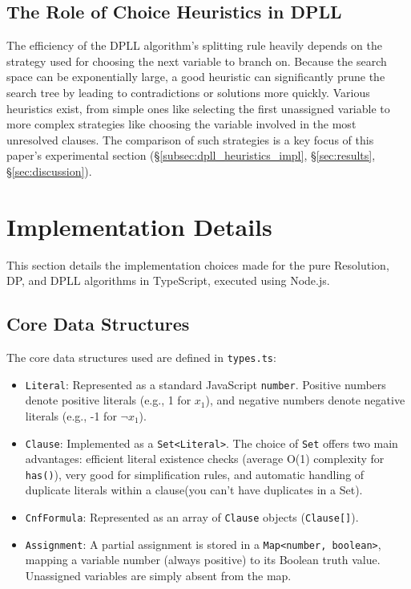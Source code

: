 \documentclass[12pt, a4paper]{article}
\begin{document}
\subsection{The Role of Choice Heuristics in DPLL}
\label{subsec:heuristics_intro}

The efficiency of the DPLL algorithm's splitting rule heavily depends on the strategy used for choosing the next variable to branch on. Because the search space can be exponentially large, a good heuristic can significantly prune the search tree by leading to contradictions or solutions more quickly. Various heuristics exist, from simple ones like selecting the first unassigned variable to more complex strategies like choosing the variable involved in the most unresolved clauses. The comparison of such strategies is a key focus of this paper's experimental section (\S\ref{subsec:dpll_heuristics_impl}, \S\ref{sec:results}, \S\ref{sec:discussion}).


\section{Implementation Details}
\label{sec:implementation}

This section details the implementation choices made for the pure Resolution, DP, and DPLL algorithms in TypeScript, executed using Node.js.

\subsection{Core Data Structures}
The core data structures used are defined in \texttt{types.ts}:
\begin{itemize}
    \item \texttt{Literal}: Represented as a standard JavaScript \texttt{number}. Positive numbers denote positive literals (e.g., 1 for $x_1$), and negative numbers denote negative literals (e.g., -1 for $\lnot x_1$).
    \item \texttt{Clause}: Implemented as a \texttt{Set<Literal>}. The choice of \texttt{Set} offers two main advantages: efficient literal existence checks (average O(1) complexity for \texttt{has()}), very good for simplification rules, and automatic handling of duplicate literals within a clause(you can't have duplicates in a Set).
    \item \texttt{CnfFormula}: Represented as an array of \texttt{Clause} objects (\texttt{Clause[]}).
    \item \texttt{Assignment}: A partial assignment is stored in a \texttt{Map<number, boolean>}, mapping a variable number (always positive) to its Boolean truth value. Unassigned variables are simply absent from the map.
\end{itemize}
\end{document}
